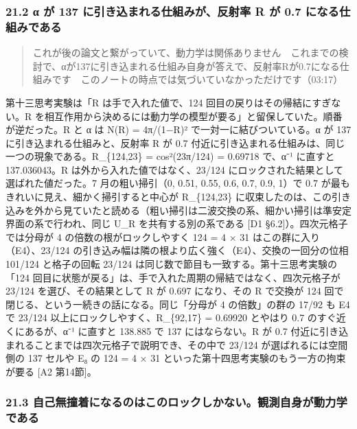 \documentclass[
  a4paper,
]{ltjsarticle}
\begin{document}
\subsubsection{21.2 α が 137 に引き込まれる仕組みが、反射率 R が 0.7
になる仕組みである}\label{ux3b1-ux304c-137-ux306bux5f15ux304dux8fbcux307eux308cux308bux4ed5ux7d44ux307fux304cux53cdux5c04ux7387-r-ux304c-0.7-ux306bux306aux308bux4ed5ux7d44ux307fux3067ux3042ux308b}

\begin{quote}
これが後の論文と繋がっていて、動力学は関係ありません　これまでの検討で、αが137に引き込まれる仕組み自身が答えで、反射率Rが0.7になる仕組みです　このノートの時点では気づいていなかっただけです（03:17）
\end{quote}

第十三思考実験は「R は手で入れた値で、124
回目の戻りはその帰結にすぎない。R
を相互作用から決めるには動力学の模型が要る」と留保していた。順番が逆だった。R
と α は N(R) = 4π/(1−R)² で一対一に結びついている。α が 137
に引き込まれる仕組みと、反射率 R が 0.7
付近に引き込まれる仕組みは、同じ一つの現象である。R\_\{124,23\} =
cos²(23π/124) = 0.69718 で、α⁻¹ に直すと 137.036043。R
は外から入れた値ではなく、23/124
にロックされた結果として選ばれた値だった。7 月の粗い掃引（0, 0.51, 0.55,
0.6, 0.7, 0.9, 1）で 0.7 が最もきれいに見え、細かく掃引すると中心が
R\_\{124,23\}
に収束したのは、この引き込みを外から見ていたと読める（粗い掃引は二波交換の系、細かい掃引は準安定界面の系で行われ、同じ
U\_R を共有する別の系である {[}D1 §6.2{]}）。四次元格子では分母が 4
の倍数の根がロックしやすく 124 = 4 × 31 はこの群に入り（E4）、23/124
の引き込み幅は隣の根より広く強く（E4）、交換の一回分の位相 101/124
と格子の回転 23/124 は同じ数で節目も一致する。第十三思考実験の「124
回目に状態が戻る」は、手で入れた周期の帰結ではなく、四次元格子が 23/124
を選び、その結果として R が 0.697 になり、その R で交換が 124
回で閉じる、という一続きの話になる。同じ「分母が 4 の倍数」の群の 17/92
も E4 で 23/124 以上にロックしやすく、R\_\{92,17\} = 0.69920 とやはり
0.7 のすぐ近くにあるが、α⁻¹ に直すと 138.885 で 137 にはならない。R が
0.7 付近に引き込まれることまでは四次元格子で説明でき、その中で 23/124
が選ばれるには空間側の 137 セルや E₈ の 124 = 4 × 31
といった第十四思考実験のもう一方の拘束が要る {[}A2 第14節{]}。

\subsubsection{21.3
自己無撞着になるのはこのロックしかない。観測自身が動力学である}\label{ux81eaux5df1ux7121ux649eux7740ux306bux306aux308bux306eux306fux3053ux306eux30edux30c3ux30afux3057ux304bux306aux3044ux89b3ux6e2cux81eaux8eabux304cux52d5ux529bux5b66ux3067ux3042ux308b}
\end{document}
